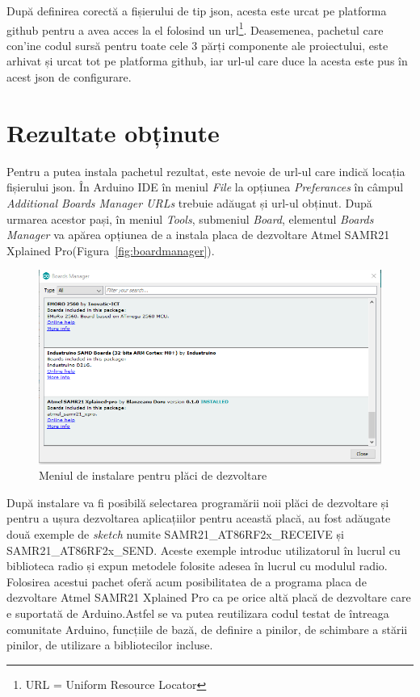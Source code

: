 \documentclass[12pt,a4paper]{report}
\begin{document}
După definirea corectă a fișierului de tip json, acesta este urcat pe platforma github pentru a avea acces la el folosind un url\footnote{URL = Uniform Resource Locator}. Deasemenea, pachetul care con'ine codul sursă pentru toate cele 3 părți componente ale proiectului, este arhivat și urcat tot pe platforma github, iar url-ul care duce la acesta este pus în acest json de configurare.

\section{Rezultate obținute}
Pentru a putea instala pachetul rezultat, este nevoie de url-ul care indică locația fișierului json. În Arduino IDE în meniul \textit{File} la opțiunea \textit{Preferances} în câmpul \textit{Additional Boards Manager URLs} trebuie adăugat și url-ul obținut. După urmarea acestor pași, în meniul \textit{Tools}, submeniul \textit{Board}, elementul \textit{Boards Manager} va apărea opțiunea de a instala placa de dezvoltare Atmel SAMR21 Xplained Pro(Figura~\ref{fig:boardmanager}).
\begin{figure}[!htb]
\centering
\includegraphics[scale=0.8]{pics/boardsmanager.png}
  \caption{Meniul de instalare pentru plăci de dezvoltare}
  \label{fig:boardsmanager}
\end{figure}

După instalare va fi posibilă selectarea programării noii plăci de dezvoltare și pentru a ușura dezvoltarea aplicațiilor pentru această placă, au fost adăugate două exemple de \textit{sketch} numite SAMR21\_AT86RF2x\_RECEIVE și SAMR21\_AT86RF2x\_SEND. Aceste exemple introduc utilizatorul în lucrul cu biblioteca radio și expun metodele folosite adesea în lucrul cu modulul radio.
Folosirea acestui pachet oferă acum posibilitatea de a programa placa de dezvoltare Atmel SAMR21 Xplained Pro ca pe orice altă placă de dezvoltare care e suportată de Arduino.Astfel se va putea reutilizara codul testat de întreaga comunitate Arduino, funcțiile de bază, de definire a pinilor, de schimbare a stării pinilor, de utilizare a bibliotecilor incluse.
\end{document}
